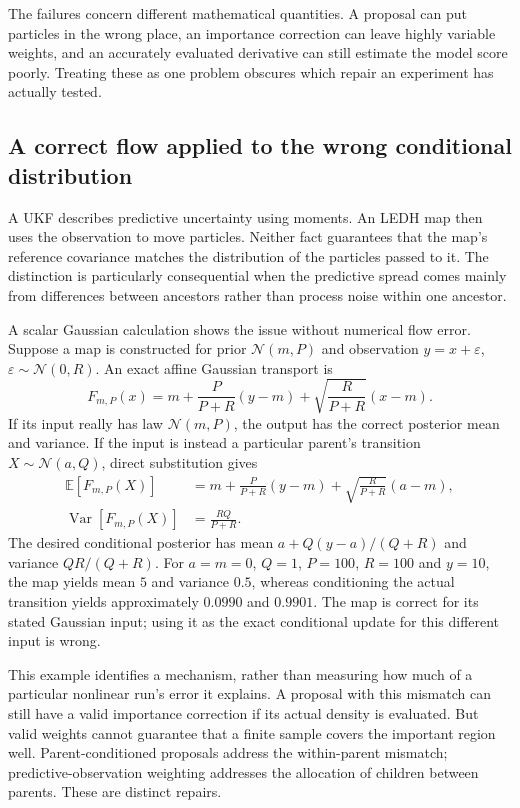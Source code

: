The failures concern different mathematical quantities. A proposal can put
particles in the wrong place, an importance correction can leave highly
variable weights, and an accurately evaluated derivative can still estimate
the model score poorly. Treating these as one problem obscures which repair
an experiment has actually tested.

\subsection{A correct flow applied to the wrong conditional distribution}

A UKF describes predictive uncertainty using moments. An LEDH map then uses
the observation to move particles. Neither fact guarantees that the map's
reference covariance matches the distribution of the particles passed to it.
The distinction is particularly consequential when the predictive spread
comes mainly from differences between ancestors rather than process noise
within one ancestor.

A scalar Gaussian calculation shows the issue without numerical flow error.
Suppose a map is constructed for prior $\mathcal N(m,P)$ and observation
$y=x+\varepsilon$, $\varepsilon\sim\mathcal N(0,R)$. An exact affine
Gaussian transport is
\begin{equation}
 F_{m,P}(x)=m+\frac{P}{P+R}(y-m)
              +\sqrt{\frac{R}{P+R}}(x-m).
\end{equation}
If its input really has law $\mathcal N(m,P)$, the output has the correct
posterior mean and variance. If the input is instead a particular parent's
transition $X\sim\mathcal N(a,Q)$, direct substitution gives
\begin{align}
 \mathbb E[F_{m,P}(X)]&=m+\frac{P}{P+R}(y-m)
                    +\sqrt{\frac{R}{P+R}}(a-m),\\
 \operatorname{Var}[F_{m,P}(X)]&=\frac{RQ}{P+R}.
\end{align}
The desired conditional posterior has mean
$a+Q(y-a)/(Q+R)$ and variance $QR/(Q+R)$. For $a=m=0$, $Q=1$,
$P=100$, $R=100$ and $y=10$, the map yields mean $5$ and variance $0.5$,
whereas conditioning the actual transition yields approximately $0.0990$
and $0.9901$. The map is correct for its stated Gaussian input; using it as
the exact conditional update for this different input is wrong.

This example identifies a mechanism, rather than measuring how much of a
particular nonlinear run's error it explains. A proposal with this mismatch
can still have a valid importance correction if its actual density is
evaluated. But valid weights cannot guarantee that a finite sample covers
the important region well. Parent-conditioned proposals address the
within-parent mismatch; predictive-observation weighting addresses the
allocation of children between parents. These are distinct repairs.

